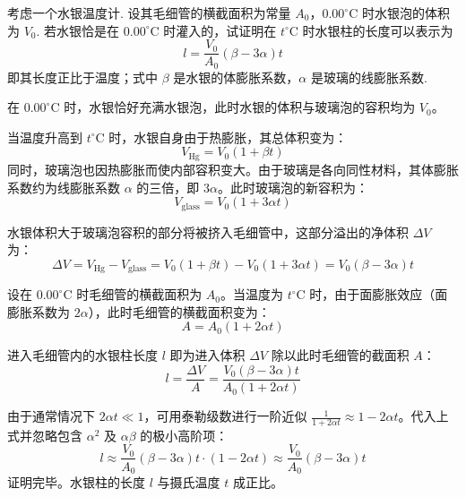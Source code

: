 \begin{exercise}\label{ex:10.2}
考虑一个水银温度计. 设其毛细管的横截面积为常量 $A_0$，$0.00^\circ\mathrm{C}$ 时水银泡的体积为 $V_0$. 若水银恰是在 $0.00^\circ\mathrm{C}$ 时灌入的，试证明在 $t^\circ\mathrm{C}$ 时水银柱的长度可以表示为
$$l = \frac{V_0}{A_0}(\beta - 3\alpha)t$$
即其长度正比于温度；式中 $\beta$ 是水银的体膨胀系数，$\alpha$ 是玻璃的线膨胀系数.
\end{exercise}
\begin{solution}
在 $0.00^\circ\mathrm{C}$ 时，水银恰好充满水银泡，此时水银的体积与玻璃泡的容积均为 $V_0$。

当温度升高到 $t^\circ\mathrm{C}$ 时，水银自身由于热膨胀，其总体积变为：
$$ V_{\mathrm{Hg}} = V_0(1 + \beta t) $$
同时，玻璃泡也因热膨胀而使内部容积变大。由于玻璃是各向同性材料，其体膨胀系数约为线膨胀系数 $\alpha$ 的三倍，即 $3\alpha$。此时玻璃泡的新容积为：
$$ V_{\mathrm{glass}} = V_0(1 + 3\alpha t) $$

水银体积大于玻璃泡容积的部分将被挤入毛细管中，这部分溢出的净体积 $\Delta V$ 为：
$$ \Delta V = V_{\mathrm{Hg}} - V_{\mathrm{glass}} = V_0(1 + \beta t) - V_0(1 + 3\alpha t) = V_0(\beta - 3\alpha)t $$

设在 $0.00^\circ\mathrm{C}$ 时毛细管的横截面积为 $A_0$。当温度为 $t^\circ\mathrm{C}$ 时，由于面膨胀效应（面膨胀系数为 $2\alpha$），此时毛细管的横截面积变为：
$$ A = A_0(1 + 2\alpha t) $$

进入毛细管内的水银柱长度 $l$ 即为进入体积 $\Delta V$ 除以此时毛细管的截面积 $A$：
$$ l = \frac{\Delta V}{A} = \frac{V_0(\beta - 3\alpha)t}{A_0(1 + 2\alpha t)} $$

由于通常情况下 $2\alpha t \ll 1$，可用泰勒级数进行一阶近似 $\frac{1}{1+2\alpha t} \approx 1 - 2\alpha t$。代入上式并忽略包含 $\alpha^2$ 及 $\alpha\beta$ 的极小高阶项：
$$ l \approx \frac{V_0}{A_0}(\beta - 3\alpha)t \cdot (1 - 2\alpha t) \approx \frac{V_0}{A_0}(\beta - 3\alpha)t $$
证明完毕。水银柱的长度 $l$ 与摄氏温度 $t$ 成正比。
\end{solution}

